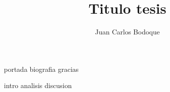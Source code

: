 \documentclass[spanish]{tesis}
\title{Titulo tesis}
\author{Juan Carlos Bodoque}
\begin{document}

{portada} %
{biografia} %
{gracias}

\begingroup
\let\cleardoublepage\clearevenpage
\tableofcontents
\endgroup

\cleardoublepage
\pagestyle{everypage}
{intro}
{analisis}
{discusion}


\end{document}
